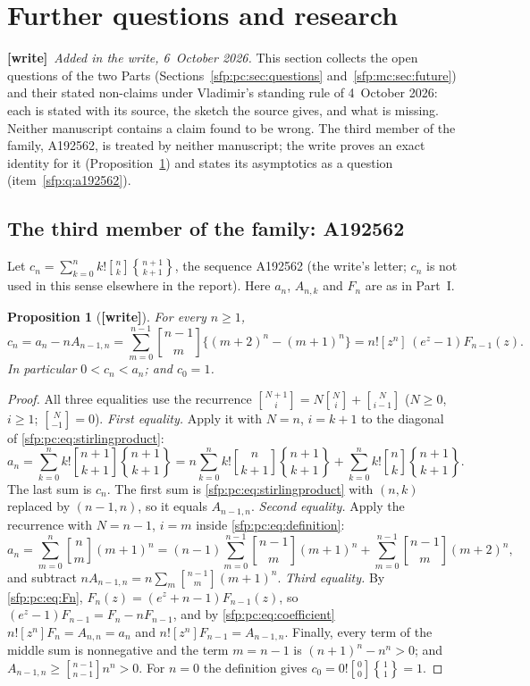 \documentclass[11pt,letterpaper]{article}
\numberwithin{equation}{section}
\newtheorem{proposition}[theorem]{Proposition}
\theoremstyle{definition}\newtheorem{definition}[theorem]{Definition}
\theoremstyle{remark}\newtheorem{remark}[theorem]{Remark}
\newcommand{\sone}[2]{\genfrac{[}{]}{0pt}{}{#1}{#2}}
\newcommand{\stwo}[2]{\genfrac{\{} {\}}{0pt}{}{#1}{#2}}
\newcommand{\wtag}{\textup{\textbf{[write]}}}
\begin{document}
\section{Further questions and research}\label{sfp:sec:further}
\noindent\wtag\ \emph{Added in the write, 6~October 2026.} This section collects the open questions of the two Parts (Sections~\ref{sfp:pc:sec:questions} and~\ref{sfp:mc:sec:future}) and their stated non-claims under Vladimir's standing rule of 4~October 2026: each is stated with its source, the sketch the source gives, and what is missing. Neither manuscript contains a claim found to be wrong. The third member of the family, A192562, is treated by neither manuscript; the write proves an exact identity for it (Proposition~\ref{sfp:prop:a192562}) and states its asymptotics as a question (item~\ref{sfp:q:a192562}).

\subsection{The third member of the family: A192562}\label{sfp:sub:a192562}
Let $c_n=\sum_{k=0}^nk!\sone nk\stwo{n+1}{k+1}$, the sequence A192562 \cite{oeisA192562} (the write's letter; $c_n$ is not used in this sense elsewhere in the report). Here $a_n$, $A_{n,k}$ and $F_n$ are as in Part~I.

\begin{proposition}[\wtag]\label{sfp:prop:a192562}
For every $n\ge1$,
\begin{equation}\label{sfp:eq:a192562}
 c_n=a_n-nA_{n-1,n}
    =\sum_{m=0}^{n-1}\sone{n-1}m\bigl\{(m+2)^n-(m+1)^n\bigr\}
    =n![z^n]\,(e^z-1)F_{n-1}(z).
\end{equation}
In particular $0<c_n<a_n$; and $c_0=1$.
\end{proposition}
\begin{proof}
All three equalities use the recurrence $\sone{N+1}{i}=N\sone Ni+\sone N{i-1}$ ($N\ge0$, $i\ge1$; $\sone N{-1}=0$). \emph{First equality.} Apply it with $N=n$, $i=k+1$ to the diagonal of \eqref{sfp:pc:eq:stirlingproduct}:
\[
 a_n=\sum_{k=0}^nk!\sone{n+1}{k+1}\stwo{n+1}{k+1}
    =n\sum_{k=0}^nk!\sone n{k+1}\stwo{n+1}{k+1}+\sum_{k=0}^nk!\sone nk\stwo{n+1}{k+1}.
\]
The last sum is $c_n$. The first sum is \eqref{sfp:pc:eq:stirlingproduct} with $(n,k)$ replaced by $(n-1,n)$, so it equals $A_{n-1,n}$. \emph{Second equality.} Apply the recurrence with $N=n-1$, $i=m$ inside \eqref{sfp:pc:eq:definition}:
\[
 a_n=\sum_{m=0}^n\sone nm(m+1)^n
    =(n-1)\sum_{m=0}^{n-1}\sone{n-1}m(m+1)^n+\sum_{m=0}^{n-1}\sone{n-1}m(m+2)^n ,
\]
and subtract $nA_{n-1,n}=n\sum_m\sone{n-1}m(m+1)^n$. \emph{Third equality.} By \eqref{sfp:pc:eq:Fn}, $F_n(z)=(e^z+n-1)F_{n-1}(z)$, so $(e^z-1)F_{n-1}=F_n-nF_{n-1}$, and by \eqref{sfp:pc:eq:coefficient} $n![z^n]F_n=A_{n,n}=a_n$ and $n![z^n]F_{n-1}=A_{n-1,n}$. Finally, every term of the middle sum is nonnegative and the term $m=n-1$ is $(n+1)^n-n^n>0$; and $A_{n-1,n}\ge\sone{n-1}{n-1}n^n>0$. For $n=0$ the definition gives $c_0=0!\sone00\stwo11=1$.
\end{proof}
\end{document}

